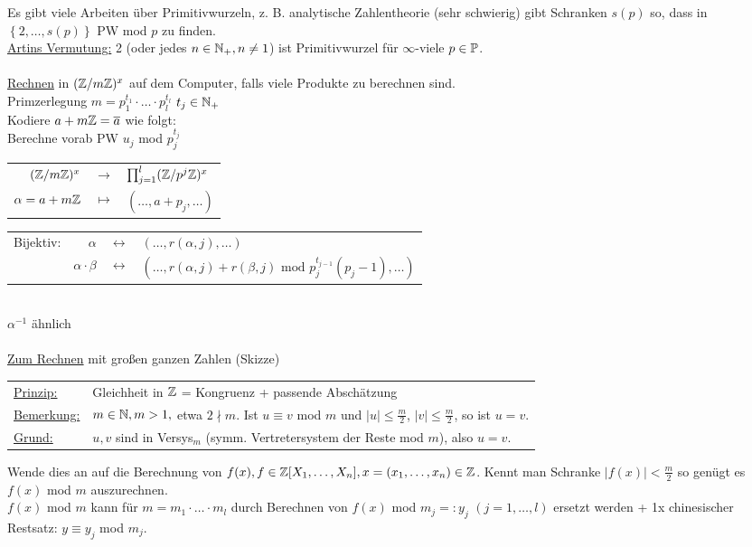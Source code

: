 \documentclass[a4paper,DIV15,BCOR12mm]{article}
\begin{document}
Es gibt viele Arbeiten über Primitivwurzeln, z. B. analytische Zahlentheorie (sehr schwierig) gibt Schranken $s(p)$ so, dass in $\left\{2,\dotsc,s(p)\right\}$ PW mod $p$ zu finden. \\

\underline{Artins Vermutung:} 2 (oder jedes $n \in \mathbb{N}_+, n \neq 1$) ist Primitivwurzel für $\infty$-viele $p \in \mathbb{P}$. \\
\\
\underline{Rechnen} in $(\mathbb{Z}/m\mathbb{Z})^x$ auf dem Computer, falls viele Produkte zu berechnen sind. \\
Primzerlegung $m = p_1^{t_1}\cdot \dotsc \cdot p_l^{t_l}$ $t_j \in \mathbb{N}_+$ \\
Kodiere $a + m\mathbb{Z} = \overline a$ wie folgt: \\
Berechne vorab PW $u_j$ mod $p_j^{t_j}$ \\
\begin{tabular}{rcl}
$(\mathbb{Z}/m\mathbb{Z})^x$ & $\to$ & $\prod_{j=1}^l(\mathbb{Z}/p^j\mathbb{Z})^x$ \\
$\alpha=a+m\mathbb{Z}$ & $\mapsto$ & $(\dotsc,a+p_j,\dotsc)$
\end{tabular}

\begin{tabular}{lrcl}
Bijektiv: & $\alpha$ & $\leftrightarrow$ & $(\dotsc,r(\alpha,j),\dotsc)$ \\
 & $\alpha \cdot \beta$ & $\leftrightarrow$ & $(\dotsc,r(\alpha,j)+r(\beta,j) \mbox{ mod }p_j^{t_{j-1}}(p_j-1),\dotsc)$ 
\end{tabular} \\
$\alpha^{-1}$ ähnlich\\
\\
\underline{Zum Rechnen} mit großen ganzen Zahlen (Skizze) \\
\begin{tabular}{ll}
\underline{Prinzip:} & Gleichheit in $\mathbb{Z}$ = Kongruenz + passende Abschätzung \\
\underline{Bemerkung:} & $m \in \mathbb{N}, m > 1,$ etwa $2 \nmid m$. Ist $u \equiv v$ mod $m$ und $|u| \leq \frac{m}{2}$, $|v| \leq \frac{m}{2}$, so ist $u=v$. \\
\underline{Grund:} & $u, v$ sind in Versys$_m$ (symm. Vertretersystem der Reste mod $m$), also $u = v$.
\end{tabular}
Wende dies an auf die Berechnung von $f(x), f \in \mathbb{Z}[X_1,\dotsc,X_n], x = (x_1,\dotsc,x_n) \in \mathbb{Z}$. Kennt man Schranke $|f(x)| < \frac{m}{2}$ so genügt es $f(x)$ mod $m$ auszurechnen. \\
$f(x)$ mod $m$ kann für $m = m_1 \cdot \dotsc \cdot m_l$ durch Berechnen von $f(x)$ mod $m_j =: y_j$ $(j=1,\dotsc,l)$ ersetzt werden + 1x chinesischer Restsatz: $y \equiv y_j$ mod $m_j$. \\
\\
\end{document}
